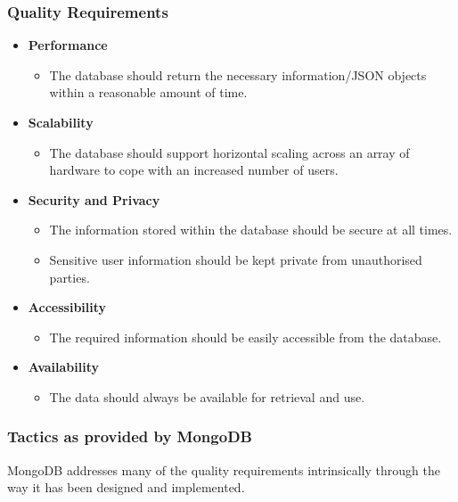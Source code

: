 \documentclass[a4paper,12pt]{article}
\begin{document}
	\subsubsection{Quality Requirements}
	\begin{itemize}
		\item\textbf{Performance}
		\begin{itemize}
			\item The database should return the necessary information/JSON objects within a reasonable amount of time.
		\end{itemize}
		
		\item\textbf{Scalability}
		\begin{itemize}
			\item The database should support horizontal scaling across an array of hardware to cope with an increased number of users. 
		\end{itemize}
		
		\item\textbf{Security and Privacy}
		\begin{itemize}
			\item The information stored within the database should be secure at all times.
			\item Sensitive user information should be kept private from unauthorised parties.
		\end{itemize}
		
		\item\textbf{Accessibility}
		\begin{itemize}
			\item The required information should be easily accessible from the database.
		\end{itemize}
		
		\item\textbf{Availability}
		\begin{itemize}
			\item The data should always be available for retrieval and use.
		\end{itemize}
	\end{itemize}
	
	\subsubsection{Tactics as provided by MongoDB}
	MongoDB addresses many of the quality requirements intrinsically through the way it has been designed and implemented.
	
\end{document}
